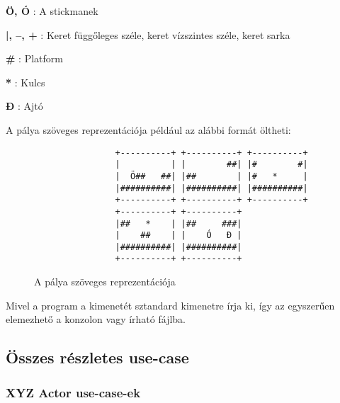 	    \begin{description}
	        \newcommand{\frameitem}[1]{\item{\textbf{#1}} }
	        \frameitem{Ö, Ó}: A stickmanek
	        \frameitem{|, --, +}: Keret függőleges széle, keret vízszintes széle, keret sarka
	        \frameitem{\#}: Platform
	        \frameitem{*}: Kulcs
	        \frameitem{Đ}: Ajtó
        \end{description}

        A pálya szöveges reprezentációja például az alábbi formát öltheti:
        
\begin{figure}[hb]
  \begin{center}
\begin{verbatim}
                +----------+ +----------+ +----------+
                |          | |        ##| |#        #|
                |  Ö##   ##| |##        | |#   *     |
                |##########| |##########| |##########|
                +----------+ +----------+ +----------+
                +----------+ +----------+
                |##   *    | |##     ###|
                |    ##    | |    Ó   Đ |
                |##########| |##########|
                +----------+ +----------+
\end{verbatim}
  \caption{A pálya szöveges reprezentációja}
  \end{center}
\end{figure}        
        
        Mivel a program a kimenetét sztandard kimenetre írja ki, így az egyszerűen elemezhető a konzolon vagy írható fájlba.
	
	\subsection{Összes részletes use-case}
        \newcommand{\ucitem}[1]{\item \textbf{Név: #1}\\}
        \newcommand{\ucdesc}[1]{\textbf{Leírás: } #1\\}
        \newcommand{\ucscenario}[1]{\textbf{Forgatókönyv: }#1\\}
        
        \subsubsection{XYZ Actor use-case-ek} %
		
